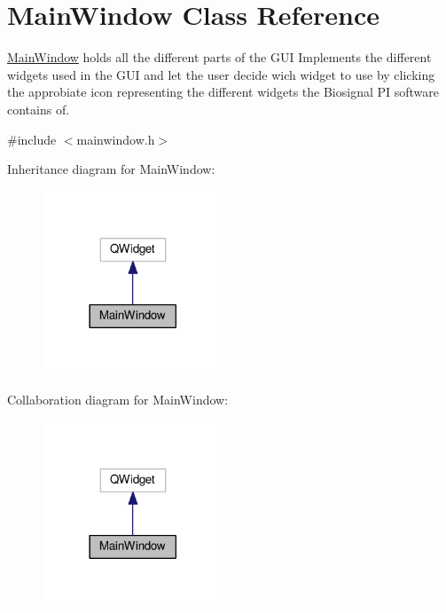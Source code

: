 \hypertarget{classMainWindow}{}\section{Main\+Window Class Reference}
\label{classMainWindow}


\hyperlink{classMainWindow}{Main\+Window} holds all the different parts of the G\+UI Implements the different widgets used in the G\+UI and let the user decide wich widget to use by clicking the approbiate icon representing the different widgets the Biosignal PI software contains of.  




{\ttfamily \#include $<$mainwindow.\+h$>$}



Inheritance diagram for Main\+Window\+:
\nopagebreak
\begin{figure}[H]
\begin{center}
\leavevmode
\includegraphics[width=153pt]{classMainWindow__inherit__graph}
\end{center}
\end{figure}


Collaboration diagram for Main\+Window\+:
\nopagebreak
\begin{figure}[H]
\begin{center}
\leavevmode
\includegraphics[width=153pt]{classMainWindow__coll__graph}
\end{center}
\end{figure}
